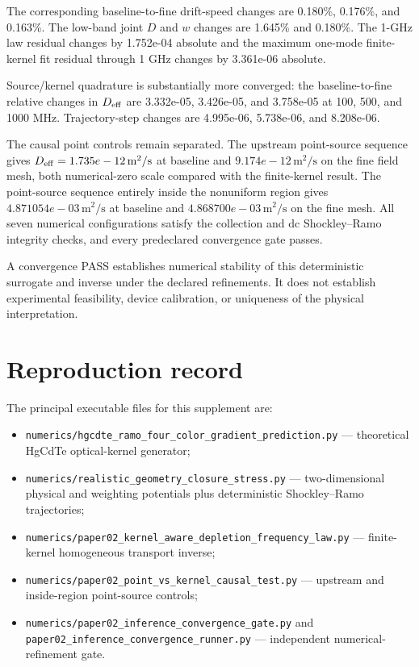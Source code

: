 \documentclass[aps,pra,onecolumn,superscriptaddress,nofootinbib]{revtex4-2}
\begin{document}
The corresponding baseline-to-fine drift-speed changes are 0.180\%, 0.176\%, and 0.163\%.  The low-band joint $D$ and $w$ changes are 1.645\% and 0.180\%.  The 1-GHz law residual changes by 1.752e-04 absolute and the maximum one-mode finite-kernel fit residual through 1 GHz changes by 3.361e-06 absolute.

Source/kernel quadrature is substantially more converged: the baseline-to-fine relative changes in $D_{\rm eff}$ are 3.332e-05, 3.426e-05, and 3.758e-05 at 100, 500, and 1000 MHz.  Trajectory-step changes are 4.995e-06, 5.738e-06, and 8.208e-06.

The causal point controls remain separated.  The upstream point-source sequence gives $D_{\rm eff}=1.735e-12\,\mathrm{m^2/s}$ at baseline and $9.174e-12\,\mathrm{m^2/s}$ on the fine field mesh, both numerical-zero scale compared with the finite-kernel result.  The point-source sequence entirely inside the nonuniform region gives $4.871054e-03\,\mathrm{m^2/s}$ at baseline and $4.868700e-03\,\mathrm{m^2/s}$ on the fine mesh.  All seven numerical configurations satisfy the collection and dc Shockley--Ramo integrity checks, and every predeclared convergence gate passes.

A convergence PASS establishes numerical stability of this deterministic surrogate and inverse under the declared refinements.  It does not establish experimental feasibility, device calibration, or uniqueness of the physical interpretation.

\section{Reproduction record}

The principal executable files for this supplement are:
\begin{itemize}
\item \texttt{numerics/hgcdte\_ramo\_four\_color\_gradient\_prediction.py} --- theoretical HgCdTe optical-kernel generator;
\item \texttt{numerics/realistic\_geometry\_closure\_stress.py} --- two-dimensional physical and weighting potentials plus deterministic Shockley--Ramo trajectories;
\item \texttt{numerics/paper02\_kernel\_aware\_depletion\_frequency\_law.py} --- finite-kernel homogeneous transport inverse;
\item \texttt{numerics/paper02\_point\_vs\_kernel\_causal\_test.py} --- upstream and inside-region point-source controls;
\item \texttt{numerics/paper02\_inference\_convergence\_gate.py} and \texttt{paper02\_inference\_convergence\_runner.py} --- independent numerical-refinement gate.
\end{itemize}
\end{document}

